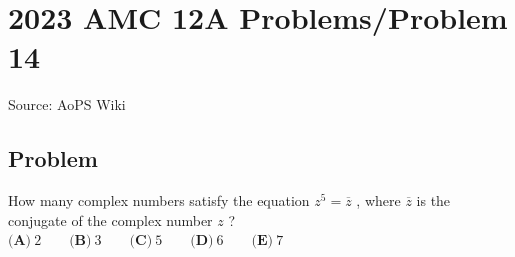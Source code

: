 \documentclass[12pt]{article}
\begin{document}
\section*{{2023 AMC 12A Problems/Problem 14}}
Source: AoPS Wiki

\subsection*{Problem}
How many complex numbers satisfy the equation $z^5=\overline{z}$ , where $\overline{z}$ is the conjugate of the complex number $z$ ? $\textbf{(A)} ~2\qquad\textbf{(B)} ~3\qquad\textbf{(C)} ~5\qquad\textbf{(D)} ~6\qquad\textbf{(E)} ~7$
\end{document}
